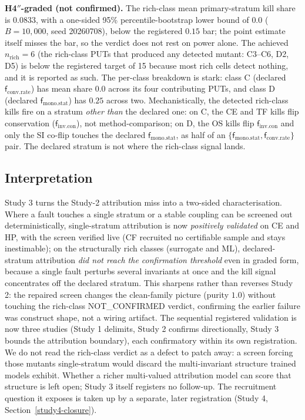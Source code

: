 \documentclass[manuscript,screen,review]{acmart}
\begin{document}
\textbf{H4\('' \)-graded (not confirmed).} The rich-class mean primary-stratum
kill share is \(0.0833\), with a one-sided 95\% percentile-bootstrap lower bound
of \(0.0\) (\(B = 10{,}000\), seed 20260708), below the registered \(0.15\) bar;
the point estimate itself misses the bar, so the verdict does not rest on power
alone. The achieved \(n_{\mathrm{rich}} = 6\) (the rich-class PUTs that produced
any detected mutant: C3--C6, D2, D5) is below the registered target of 15
because most rich cells detect nothing, and it is reported as such. The
per-class breakdown is stark: class C (declared \(\mathsf{f}_{\mathrm{conv.rate}}\)) has mean
share \(0.0\) across its four contributing PUTs, and class D (declared
\(\mathsf{f}_{\mathrm{mono.stat}}\)) has \(0.25\) across two. Mechanistically, the detected
rich-class kills fire on a stratum \emph{other than} the declared one:
on C, the CE and TF kills flip conservation (\(\mathsf{f}_{\mathrm{inv.con}}\)), not
method-comparison; on D, the OS kills flip \(\mathsf{f}_{\mathrm{inv.con}}\) and only the SI
co-flip touches the declared \(\mathsf{f}_{\mathrm{mono.stat}}\), as half of an
\(\{\mathsf{f}_{\mathrm{mono.stat}}, \mathsf{f}_{\mathrm{conv.rate}}\}\) pair. The declared stratum is not
where the rich-class signal lands.

\subsection{Interpretation}\label{study3-interpretation}

Study 3 turns the Study-2 attribution miss into a two-sided characterisation.
Where a fault touches a single stratum or a stable coupling can be screened out
deterministically, single-stratum attribution is now
\emph{positively validated} on CE and HP, with the screen verified live (CF
recruited no certifiable sample and stays inestimable); on the structurally
rich classes (surrogate and ML), declared-stratum attribution \emph{did not
reach the confirmation threshold} even in graded form, because a single fault
perturbs several invariants at once and the kill signal concentrates off the
declared stratum. This sharpens rather than reverses Study 2: the repaired
screen changes the clean-family picture (purity \(1.0\)) without touching the
rich-class NOT\_CONFIRMED verdict, confirming the earlier failure was construct
shape, not a wiring artifact. The sequential registered validation is now three
studies (Study 1 delimits, Study 2 confirms directionally, Study 3 bounds the
attribution boundary), each confirmatory within its own registration. We do not
read the rich-class verdict as a defect to patch away: a screen forcing those
mutants single-stratum would discard the multi-invariant structure trained
models exhibit. Whether a richer multi-valued attribution model can score that
structure is left open; Study 3 itself registers no follow-up. The recruitment
question it exposes is taken up by a separate, later registration (Study 4,
Section~\ref{study4-closure}).
\end{document}
